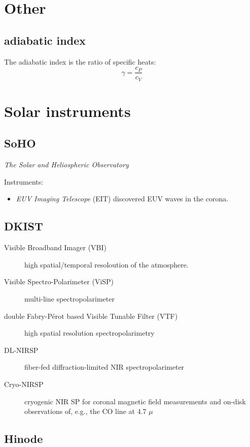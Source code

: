 \documentclass{article}
\begin{document}
\section{Other}
\subsection{adiabatic index}
The adiabatic index is the ratio of specific heats:
\[
    \gamma = \frac{c_{P}}{c_{V}}
    \]

\section{Solar instruments}
\subsection{SoHO}
\emph{The Solar and Heliospheric Observatory}

Instruments:
\begin{itemize}
    \item \emph{EUV Imaging Telescope} (EIT) discovered EUV waves
        in the corona.
\end{itemize}

\subsection{DKIST}
\begin{description}
    \item [Visible Broadband Imager (VBI)] high spatial/temporal resoloution
        of the atmosphere.
    \item [Visible Spectro-Polarimeter (ViSP)] multi-line spectropolarimeter
    \item [double Fabry-P\'erot based Visible Tunable Filter (VTF)] high spatial
        resolution spectropolarimetry
    \item [DL-NIRSP] fiber-fed diffraction-limited NIR spectropolarimeter
    \item [Cryo-NIRSP] cryogenic NIR SP for coronal magnetic field measurements
        and on-disk observations of, e.g., the CO line at 4.7 ${\mu}$
\end{description}
\subsection{Hinode}
\end{document}
